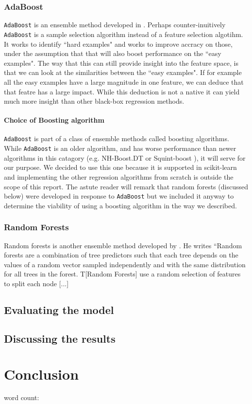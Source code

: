 \documentclass[british]{article}
\newcommand{\code}[1]{\texttt{#1}}
\begin{document}
\subsubsection{AdaBoost} \code{AdaBoost} is an ensemble method developed in \autocite{Freund1997}. Perhaps counter-inuitively \code{AdaBoost} is a sample selection algorithm instead of a feature selection algotihm. It works to identify ``hard examples" and works to improve accracy on those, under the assumption that that will also boost performance on the ``easy examples". The way that this can still provide insight into the feature space, is that we can look at the similarities between the ``easy examples". If for example all the easy examples have a large magnitude in one feature, we can deduce that that featre has a large impact. While this deduction is not a native it can yield much more insight than other black-box regression methods. 

\paragraph{Choice of Boosting algorithm} \code{AdaBoost} is part of a class of ensemble methods called boosting algorithms. While \code{AdaBoost} is an older algorithm, and has worse performance than newer algorithms in this catagory (e.g. NH-Boost.DT or Squint-boost \autocite{NormalHedge,Otten2016,Vente2016}), it will serve for our purpose. We decided to use this one because it is supported in scikit-learn \autocite{Pedregosa2012} and implementing the other regression algorithms from scratch is outside the scope of this report. The astute reader will remark that random forests (discussed below) were developed in response to \code{AdaBoost} but we included it anyway to determine the viability of using a boosting algorithm in the way we described. 

\subsubsection{Random Forests} Random forests is another ensemble method developed by \autocite{Breiman2001}. He writes ``Random forests are a combination of tree predictors such that each tree depends on the values of a random vector sampled independently and with the same distribution for all trees in the forest. T[Random Forests] use a random selection of features to split each node [...]

\subsection{Evaluating the model}
\label{evaluation}

\subsection{Discussing the results}
\label{discussion}


\section{Conclusion}
\label{conclusion}

 
 
 
word count: 
\printbibliography
\end{document}
